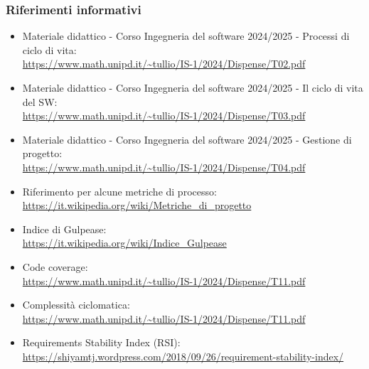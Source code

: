         \subsubsection{Riferimenti informativi}
        \begin{itemize}
            \item Materiale didattico - Corso Ingegneria del software 2024/2025 - Processi di ciclo di vita: \\ \url{https://www.math.unipd.it/~tullio/IS-1/2024/Dispense/T02.pdf}
            \item Materiale didattico - Corso Ingegneria del software 2024/2025 - Il ciclo di vita del SW: \\ \url{https://www.math.unipd.it/~tullio/IS-1/2024/Dispense/T03.pdf}
            \item Materiale didattico - Corso Ingegneria del software 2024/2025 - Gestione di progetto: \\ \url{https://www.math.unipd.it/~tullio/IS-1/2024/Dispense/T04.pdf}
            \item Riferimento per alcune metriche di processo: \\ \url{https://it.wikipedia.org/wiki/Metriche_di_progetto}
            \item Indice di Gulpease: \\ \url{https://it.wikipedia.org/wiki/Indice_Gulpease}
            \item Code coverage: \\ \url{https://www.math.unipd.it/~tullio/IS-1/2024/Dispense/T11.pdf}
            \item Complessità ciclomatica: \\ \url{https://www.math.unipd.it/~tullio/IS-1/2024/Dispense/T11.pdf}
            \item Requirements Stability Index (RSI): \\ \url{https://shiyamtj.wordpress.com/2018/09/26/requirement-stability-index/}
        
        \end{itemize}